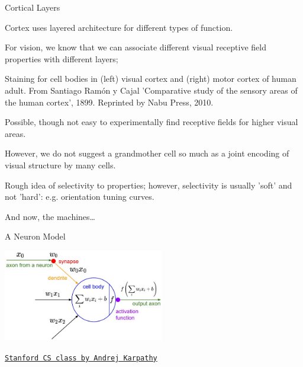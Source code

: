 \documentclass[12pt,t]{beamer}
\begin{document}
\begin{frame}[c]{Cortical Layers}


Cortex uses layered architecture for different types of function.

For vision, we know that we can associate different visual receptive field properties with different layers;

Staining for cell bodies in (left) visual cortex and (right) motor cortex of human adult. From Santiago Ramón y Cajal 'Comparative study of the sensory areas of the human cortex', 1899. Reprinted by Nabu Press, 2010.

\end{frame}

\begin{frame}

Possible, though not easy to experimentally find receptive fields for higher visual areas.

However, we do not suggest a grandmother cell so much as a joint encoding of visual structure by many cells.

Rough idea of selectivity to properties; however, selectivity is usually 'soft' and not 'hard':
e.g. orientation tuning curves.

\end{frame}

\begin{frame}

And now, the machines…

\end{frame}

\begin{frame}[c]{A Neuron Model}

\includegraphics[height=40mm]{Figs/neuron_model.jpeg}

\hfill
{\footnotesize \lolit
\href{http://cs231n.github.io}{\tt Stanford CS class by Andrej Karpathy}
}

\end{frame}
\end{document}
